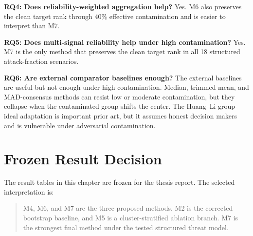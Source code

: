 \textbf{RQ4: Does reliability-weighted aggregation help?} Yes. M6 also preserves the clean target rank through 40\% effective contamination and is easier to interpret than M7.

\textbf{RQ5: Does multi-signal reliability help under high contamination?} Yes. M7 is the only method that preserves the clean target rank in all 18 structured attack-fraction scenarios.

\textbf{RQ6: Are external comparator baselines enough?} The external baselines are useful but not enough under high contamination. Median, trimmed mean, and MAD-consensus methods can resist low or moderate contamination, but they collapse when the contaminated group shifts the center. The Huang--Li group-ideal adaptation is important prior art, but it assumes honest decision makers and is vulnerable under adversarial contamination.

\section{Frozen Result Decision}

The result tables in this chapter are frozen for the thesis report. The selected interpretation is:

\begin{quote}
M4, M6, and M7 are the three proposed methods. M2 is the corrected bootstrap baseline, and M5 is a cluster-stratified ablation branch. M7 is the strongest final method under the tested structured threat model.
\end{quote}
